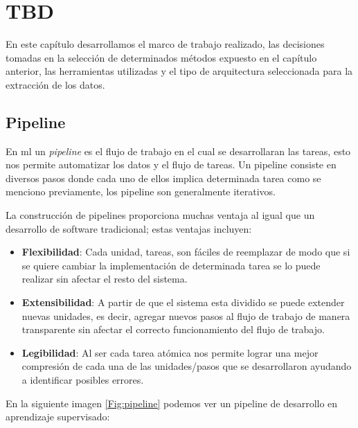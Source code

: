 \chapter{TBD}\label{ch:undefined}
En este capítulo desarrollamos el marco de trabajo realizado, las decisiones tomadas en la selección de determinados métodos expuesto en el capítulo anterior, las  herramientas utilizadas y el tipo de arquitectura seleccionada para la extracción de los datos.

\section{Pipeline}\label{sec: pipeline}
En \ac{ml} un \textit{pipeline} es el flujo de trabajo en el cual se desarrollaran las tareas, esto nos permite automatizar los datos y el flujo de tareas. Un pipeline consiste en diversos pasos donde cada uno de ellos implica determinada tarea como se menciono previamente, los pipeline son generalmente iterativos.

La construcción de pipelines proporciona muchas ventaja al igual que un desarrollo de software tradicional; estas ventajas incluyen:
\begin{itemize}
\item \textbf{Flexibilidad}: Cada unidad, tareas, son fáciles de reemplazar de modo que si se quiere cambiar la implementación de determinada tarea se lo puede realizar sin afectar el resto del sistema.

\item \textbf{Extensibilidad}: A partir de que el sistema esta dividido se puede extender nuevas unidades, es decir, agregar nuevos pasos al flujo de trabajo de manera transparente sin afectar el correcto funcionamiento del flujo de trabajo.

\item \textbf{Legibilidad}: Al ser cada tarea atómica nos permite lograr una mejor compresión de cada una de las unidades/pasos que se desarrollaron ayudando a identificar posibles errores.

\end{itemize}

En la siguiente imagen \ref{Fig:pipeline} podemos ver un pipeline de desarrollo en aprendizaje supervisado:

